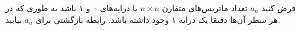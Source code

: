 \p    
    فرض کنید $a_n$ تعداد ماتریس‌های متقارن $n \times n$ با درایه‌های ۰ و ۱ باشد به طوری که در هر سطر آن‌ها دقیقا یک درایه ۱ وجود داشته باشد. رابطه بازگشتی برای $a_n$ بیابید.


